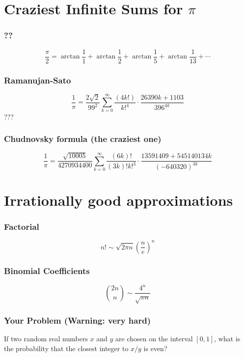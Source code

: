 \documentclass{beamer}
\begin{document}
\section{Craziest Infinite Sums for \(\pi\)}
\begin{frame}
  \frametitle{??}
  \[\frac{\pi}{2}=\arctan{\frac{1}{1}}+\arctan{\frac{1}{2}}+\arctan{\frac{1}{5}}+\arctan{\frac{1}{13}}+\cdots\]
\end{frame}
\begin{frame}
\frametitle{Ramanujan-Sato}
\[\frac{1}{\pi}=\frac{2\sqrt2}{99^2}\sum_{k=0}^{\infty}\frac{(4k!)}{k!^4}\cdot\frac{26390k+1103}{396^{4k}}\]
???
\end{frame}
\begin{frame}
\frametitle{Chudnovsky formula (the craziest one)}
\[
\frac{1}{\pi}=\frac{\sqrt{10005}}{4270934400}\sum_{k=0}^{\infty}\frac{(6k)!}{(3k)!k!^3}\cdot\frac{13591409+545140134k}{(-640320)^{3k}}
\]
\end{frame}
\section{Irrationally good approximations}
\begin{frame}
  \frametitle{Factorial}
  \[n!\sim\sqrt{2\pi n}\left(\frac{n}{e}\right)^n\]
\end{frame}
\begin{frame}
  \frametitle{Binomial Coefficients}
  \[\binom{2n}{n}\sim\frac{4^n}{\sqrt{\pi n}}\]
\end{frame}
\begin{frame}
  \frametitle{Your Problem (Warning: very hard)}
  If two random real numbers \(x\) and \(y\) are chosen
  on the interval \([0,1]\), what is the probability
  that the closest integer to \(x/y\) is even?
\end{frame}
\end{document}
